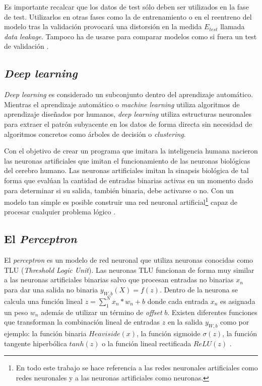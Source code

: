 Es importante recalcar que los datos de test sólo deben ser utilizados en la fase de test. Utilizarlos en otras fases como la de entrenamiento o en el reentreno del modelo tras la validación provocará una distorsión en la medida $E_{test}$ llamada \textit{data leakage}. Tampoco ha de usarse para comparar modelos como si fuera un test de validación \cite{machinelearningbook, validationsource, paramtuning}.


\subsection{\textit{Deep learning}}
\textit{Deep learning} es considerado un subconjunto dentro del aprendizaje automático. Mientras el aprendizaje automático o \textit{machine learning} utiliza algoritmos de aprendizaje diseñados por humanos, \textit{deep learning} utiliza estructuras neuronales para extraer el patrón subyacente en los datos de forma directa sin necesidad de algoritmos concretos como árboles de decisión o \textit{clustering}.

Con el objetivo de crear un programa que imitara la inteligencia humana nacieron las neuronas artificiales que imitan el funcionamiento de las neuronas biológicas del cerebro humano. Las neuronas artificiales imitan la sinapsis biológica de tal forma que evalúan la cantidad de entradas binarias activas en un momento dado para determinar si su salida, también binaria, debe activarse o no. Con un modelo tan simple es posible construir una red neuronal artificial\footnote{En todo este trabajo se hace referencia a las redes neuronales artificiales como redes neuronales y a las neuronas artificiales como neuronas.} capaz de procesar cualquier problema lógico \cite{mcculloch1943}.

\subsection{El \textit{Perceptron}}
El \textit{perceptron} es un modelo de red neuronal que utiliza neuronas conocidas como TLU (\textit{Threshold Logic Unit}). Las neuronas TLU funcionan de forma muy similar a las neuronas artificiales binarias salvo que procesan entradas no binarias $x_n$ para dar una salida no binaria $y_{W,b}(X)=f(z)$. Dentro de la neurona se calcula una función lineal $z=\sum_{1}^{N}x_n*w_n + b$ donde cada entrada $x_n$ es asignada un peso $w_n$ además de utilizar un término de \textit{offset} $b$. Existen diferentes funciones que transforman la combinación lineal de entradas $z$ en la salida $y_{W,b}$ como por ejemplo: la función binaria $Heaviside(x)$, la función sigmoide $\sigma(z)$, la función tangente hiperbólica $tanh(z)$ o la función lineal rectificada $ReLU(z)$ \cite{rosenblatt1957, rumelhart1985,machinelearningbook}.

